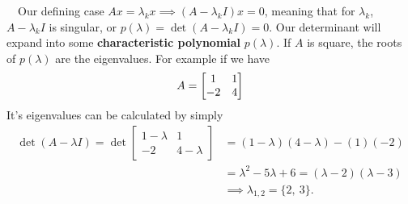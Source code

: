 \documentclass[11pt]{article}
\begin{document}
\begin{figure}
\end{figure}
\noindent \hspace{-0.5cm} \textbullet \ \ Our defining case $Ax = \lambda_{k} x \implies (A - \lambda_{k} I)x = 0$, meaning that for $\lambda_{k}$, $A - \lambda_{k}I$ is singular, or $p(\lambda) = \det (A - \lambda_{k}I) = 0$. Our determinant will expand into some \textbf{characteristic polynomial} $p(\lambda)$. If $A$ is square, the roots of $p(\lambda)$ are the eigenvalues. For example if we have
$$A = \begin{bmatrix} 1 & 1 \\ -2 & 4 \end{bmatrix}$$
It's eigenvalues can be calculated by simply
\begin{align*}
	\det (A - \lambda I) = \det \begin{bmatrix}
     1 - \lambda & 1\\
   -2 & 4 - \lambda
\end{bmatrix} 
&= (1 - \lambda)(4-\lambda) - (1)(-2)\\ &= \lambda^{2}-5\lambda + 6 = (\lambda -2)(\lambda - 3) \\
&\implies \lambda_{1,2} = \{2,\ 3\}.
\end{align*}
\end{document}

